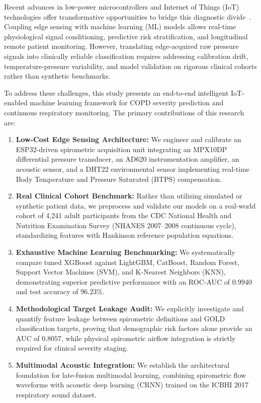 \documentclass[conference]{IEEEtran}
\begin{document}
Recent advances in low-power microcontrollers and Internet of Things (IoT) technologies offer transformative opportunities to bridge this diagnostic divide~\cite{badr2020smart, amaral2018machine}. Coupling edge sensing with machine learning (ML) models allows real-time physiological signal conditioning, predictive risk stratification, and longitudinal remote patient monitoring. However, translating edge-acquired raw pressure signals into clinically reliable classification requires addressing calibration drift, temperature-pressure variability, and model validation on rigorous clinical cohorts rather than synthetic benchmarks.

To address these challenges, this study presents an end-to-end intelligent IoT-enabled machine learning framework for COPD severity prediction and continuous respiratory monitoring. The primary contributions of this research are:
\begin{enumerate}
    \item \textbf{Low-Cost Edge Sensing Architecture:} We engineer and calibrate an ESP32-driven spirometric acquisition unit integrating an MPX10DP differential pressure transducer, an AD620 instrumentation amplifier, an acoustic sensor, and a DHT22 environmental sensor implementing real-time Body Temperature and Pressure Saturated (BTPS) compensation.
    \item \textbf{Real Clinical Cohort Benchmark:} Rather than utilizing simulated or synthetic patient data, we preprocess and validate our models on a real-world cohort of 4,241 adult participants from the CDC National Health and Nutrition Examination Survey (NHANES 2007--2008 continuous cycle), standardizing features with Hankinson reference population equations.
    \item \textbf{Exhaustive Machine Learning Benchmarking:} We systematically compare tuned XGBoost against LightGBM, CatBoost, Random Forest, Support Vector Machines (SVM), and K-Nearest Neighbors (KNN), demonstrating superior predictive performance with an ROC-AUC of $0.9940$ and test accuracy of $96.23\%$.
    \item \textbf{Methodological Target Leakage Audit:} We explicitly investigate and quantify feature leakage between spirometric definitions and GOLD classification targets, proving that demographic risk factors alone provide an AUC of $0.8057$, while physical spirometric airflow integration is strictly required for clinical severity staging.
    \item \textbf{Multimodal Acoustic Integration:} We establish the architectural foundation for late-fusion multimodal learning, combining spirometric flow waveforms with acoustic deep learning (CRNN) trained on the ICBHI 2017 respiratory sound dataset.
\end{enumerate}
\end{document}
